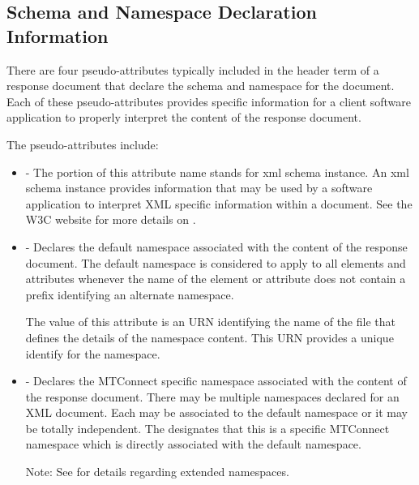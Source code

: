 \documentclass{mtconnect}	%
\begin{document}
\pagebreak

\subsection{Schema and Namespace Declaration Information}
\label{appendix:Schema and Namespace Declaration Information}

There are four pseudo-attributes typically included in the \gls{header term} of a \gls{response document} that declare the \gls{schema} and \gls{namespace} for the document.  Each of these pseudo-attributes provides specific information for a client software application to properly interpret the content of the \gls{response document}.

The pseudo-attributes include:

\begin{itemize}

\item {} - The  portion of this attribute name stands for \gls{xml schema} instance.  An \gls{xml schema} instance provides information that may be used by a software application to interpret XML specific information within a document.  See the W3C website for more details on .

\item {} - Declares the default \gls{namespace} associated with the content of the \gls{response document}.  The default \gls{namespace} is considered to apply to all elements and attributes whenever the name of the element or attribute does not contain a prefix identifying an alternate \gls{namespace}.

The value of this attribute is an URN identifying the name of the file that defines the details of the \gls{namespace} content.  This URN provides a unique identify for the \gls{namespace}.

\item {} - Declares the MTConnect specific \gls{namespace} associated with the content of the \gls{response document}.  There may be multiple \glspl{namespace} declared for an XML document.  Each may be associated to the default \gls{namespace} or it may be totally independent.  The  designates that this is a specific MTConnect \gls{namespace} which is directly associated with the default \gls{namespace}.

\begin{note} 
Note:	See  for details regarding extended \glspl{namespace}.
\end{note}


\end{itemize}
\end{document}
